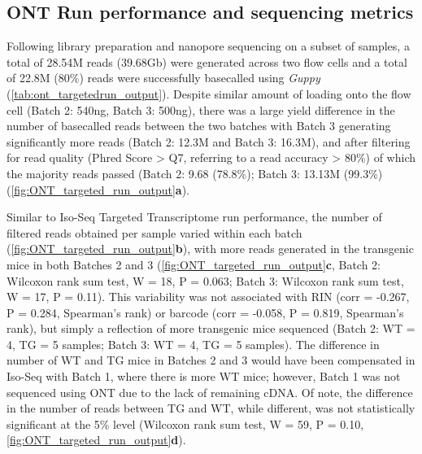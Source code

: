 \subsection{ONT Run performance and sequencing metrics}
Following library preparation and nanopore sequencing on a subset of samples, a total of 28.54M reads (39.68Gb) were generated across two flow cells and a total of 22.8M (80\%) reads were successfully basecalled using \textit{Guppy} (\cref{tab:ont_targetedrun_output}). Despite similar amount of loading onto the flow cell (Batch 2: 540ng, Batch 3: 500ng), there was a large yield difference in the number of basecalled reads between the two batches with Batch 3 generating significantly more reads (Batch 2: 12.3M and Batch 3: 16.3M), and after filtering for read quality (Phred Score > Q7, referring to a read accuracy > 80\%) of which the majority reads passed (Batch 2: 9.68 (78.8\%); Batch 3: 13.13M (99.3\%) (\cref{fig:ONT_targeted_run_output}\textbf{a}). 

Similar to Iso-Seq Targeted Transcriptome run performance, the number of filtered reads obtained per sample varied within each batch (\cref{fig:ONT_targeted_run_output}\textbf{b}), with more reads generated in the transgenic mice in both Batches 2 and 3 (\cref{fig:ONT_targeted_run_output}\textbf{c}, Batch 2: Wilcoxon rank sum test, W = 18, P = 0.063; Batch 3: Wilcoxon rank sum test, W = 17, P = 0.11). This variability was not associated with RIN (corr = -0.267, P = 0.284, Spearman's rank) or barcode (corr = -0.058, P = 0.819, Spearman's rank), but simply a reflection of more transgenic mice sequenced (Batch 2: WT = 4, TG = 5 samples; Batch 3: WT = 4, TG = 5 samples). The difference in number of WT and TG mice in Batches 2 and 3 would have been compensated in Iso-Seq with Batch 1, where there is more WT mice; however, Batch 1 was not sequenced using ONT due to the lack of remaining cDNA. Of note, the difference in the number of reads between TG and WT, while different, was not statistically significant at the 5\% level (Wilcoxon rank sum test, W = 59, P = 0.10, \cref{fig:ONT_targeted_run_output}\textbf{d}).
  
